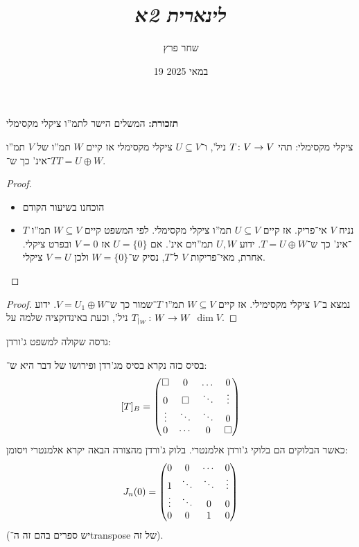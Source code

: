 \documentclass[]{../../../../tex/classes/styledArticle}
\author{שחר פרץ}
\title{\textit{לינארית 2א}}
\date{19 במאי 2025}
\begin{document}
    \maketitle
    \textbf{תזכורת: }המשלים הישר לתמ''ו ציקלי מקסימלי 
    
    {ציקלי מקסימלי: תהי $T \colon V \to V$} ניל', ו־$U \subseteq V$ ציקלי מקסימלי אז קיים $W$ תמ''ו של $V$ תמ''ו $T$־אינ' כך ש־$T = U \oplus W$. 
    
    \begin{proof}
        \begin{itemize}
            \item[$\implies$]הוכחנו בשיעור הקודם
            \item[$\impliedby$]נניח $V$ אי־פריק. אז קיים $U \subseteq V$ תמ''ו ציקלי מקסימלי. לפי המשפט קיים $W \subseteq V$ תמ''ו $T$־אינ' כך ש־$T = U \oplus W$. ידוע $U, W$ תמ''וים אינ'. אם $U = \{0\}$ אז $V = 0$ ובפרט ציקלי. אחרת, מאי־פריקות $V$ ל־$T$, נסיק ש־$W = \{0\}$ ולכן $V = U$ ציקלי. 
        \end{itemize}
    \end{proof}
    
    \begin{proof}
        נמצא ב־$V$ ציקלי מקסימילי. אז קיים $W \subseteq V$ תמ''ו $T$־שמור כך ש־$V = U_1 \oplus W$. ידוע $T_{|_W} \colon W \to W$ ניל', וכעת באינדוקציה שלמה על $\dim V$. 
    \end{proof}
    
    גרסה שקולה למשפט ג'ורדן: 
    
    בסיס כזה נקרא בסיס מג'רדן ופירושו של דבר היא ש־: 
    \[ [T]_B = \begin{pmatrix} \square & 0 & \dots &0 \\ 0 & \square & \ddots & \vdots \\ \vdots & \ddots & \ddots & 0 \\ 0 & \cdots & 0 & \square \end{pmatrix} \]
    כאשר הבלוקים הם בלוקי ג'ורדן אלמנטרי. בלוק ג'ורדן מהצורה הבאה יקרא אלמנטרי ויסומן: 
    \[ J_n(0) = \begin{pmatrix} 0 & 0 & \cdots & 0 \\ 1 & \ddots & \ddots & \vdots \\ \vdots & \ddots & 0 & 0 \\ 0 & 0 & 1 & 0 \end{pmatrix} \]
    (יש ספרים בהם זה ה־transpose של זה). 
    
\end{document}
